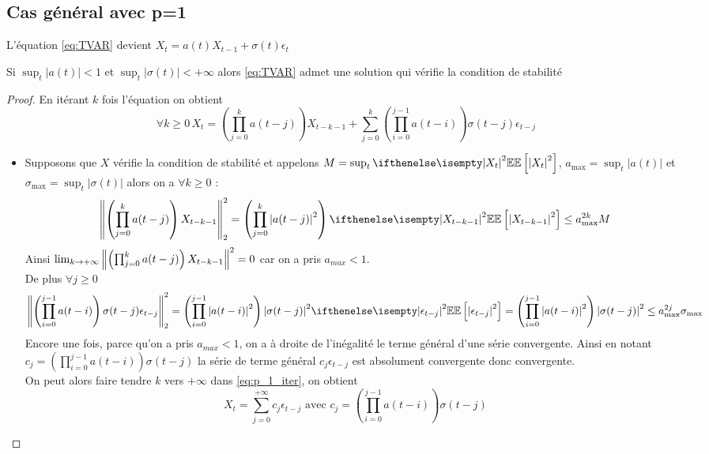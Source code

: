 \documentclass[a4paper,french]{article}
\begin{document}
\subsection{Cas général avec p=1}
L'équation \eqref{eq:TVAR} devient $X_t = a(t)X_{t-1} + \sigma(t) \epsilon_t$
\begin{Prop}
Si $\sup_t |a(t)| < 1$ et $\sup_t |\sigma(t)| < +\infty$ alors \eqref{eq:TVAR} admet une solution qui vérifie la condition de stabilité
\end{Prop}
\begin{proof}
En itérant $k$ fois l'équation on obtient 
\begin{equation}\label{eq:p_1_iter} 
\forall k \geq 0 \, X_t = \left( \prod_{j=0}^{k} a(t-j)  \right) X_{t-k-1} + \sum_{j=0}^k \left( \prod_{i=0}^{j-1} a(t-i) \right) \sigma(t-j)\epsilon_{t-j}
\end{equation}
\begin{itemize}
\item Supposons que $X$ vérifie la condition de stabilité et appelons $M = \sup_t \EE[\abs{X_t}^2]$, $a_{\max} = \sup_t |a(t)|$ et $\sigma_{\max} = \sup_t |\sigma(t)|$ alors on a $\forall k \geq 0$ :
\[
\norm{\left( \prod_{j=0}^{k} a(t-j)  \right) X_{t-k-1} }_2^2 = \left( \prod_{j=0}^{k} \abs{a(t-j)}^2 \right) \EE[\abs{X_{t-k-1}}^2] \leq a_{\max}^{2k} M
\]
Ainsi $\lim_{k \rightarrow +\infty} { \left\| \left( \prod_{j=0}^{k} a(t-j)  \right) X_{t-k-1}  \right\|}^2 = 0$ car on a pris $a_{max} < 1$.\\ 
De plus $\forall j \geq 0$
\begin{equation}\label{eq:p_1_sommabilite}
\norm{\left( \prod_{i=0}^{j-1} a(t-i) \right) \sigma(t-j)\epsilon_{t-j}}_2^2 =  \left( \prod_{i=0}^{j-1} \abs{a(t-i)}^2 \right) \abs{\sigma(t-j)}^2 \EE[\abs{\epsilon_{t-j}}^2]
= \left( \prod_{i=0}^{j-1} \abs{a(t-i)}^2 \right) \abs{\sigma(t-j)}^2
\leq a_{\max}^{2j} \sigma_{\max}
\end{equation}
Encore une fois, parce qu'on a pris $a_{max}<1$, on a à droite de l'inégalité le terme général d'une série convergente. Ainsi en notant $c_j = \left( \prod_{i=0}^{j-1} a(t-i) \right) \sigma(t-j)$ la série de terme général $c_j \epsilon_{t-j}$ est absolument convergente donc convergente. \\
On peut alors faire tendre $k$ vers $+\infty$ dans \eqref{eq:p_1_iter}, on obtient 
\begin{equation}\label{eq:p_1_solution}
X_t = \sum_{j=0}^{+\infty} c_j  \epsilon_{t-j} \text{ avec } c_j = \left( \prod_{i=0}^{j-1} a(t-i) \right) \sigma(t-j)
\end{equation}

\end{itemize}
\end{proof}
\end{document}
